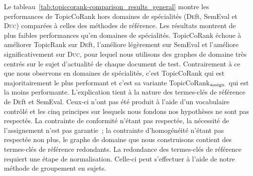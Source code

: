         Le tableau~\ref{tab:topiccorank-comparison_results_general} montre les
        performances de TopicCoRank hors domaines de spécialités (\textsc{De}ft,
        SemEval et \textsc{Duc}) comparées à celles des méthodes de référence.
        Les résultats montrent de plus faibles performances qu'en domaines de
        spécialités. TopicCoRank échoue à améliorer TopicRank sur \textsc{De}ft,
        l'améliore légèrement sur SemEval et l'améliore significativement sur
        \textsc{Duc}, pour lequel nous utilisons des graphes de domaine très
        centrés sur le sujet d'actualité de chaque document de test.
        Contrairement à ce que nous observons en domaines de spécialités, c'est
        TopicCoRank qui est majoritairement le plus performant et c'est sa
        variante TopicCoRank$_\textnormal{assign.}$ qui est la moins
        performante. L'explication tient à la nature des termes-clés de
        référence de \textsc{De}ft et SemEval. Ceux-ci n'ont pas été produit à
        l'aide d'un vocabulaire contrôlé et les cinq principes sur lesquels nous
        fondons nos hypothèses ne sont pas respectés. La contrainte de
        conformité n'étant pas respectée, la nécessité de l'assignement n'est
        pas garantie~; la contrainte d'homogénéité n'étant pas respectée non
        plus, le graphe de domaine que nous construisons contient des
        termes-clés de référence redondants. La redondance des termes-clés de
        référence requiert une étape de normalisation. Celle-ci peut s'effectuer
        à l'aide de notre méthode de groupement en sujets.

